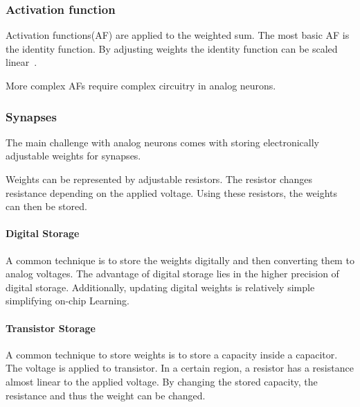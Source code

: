 \documentclass[conference]{IEEEtran}
\begin{document}
    \subsubsection{Activation function}

    Activation functions(AF) are applied to the weighted sum.
    The most basic AF is the identity function.
    By adjusting weights the identity function can be scaled linear~\cite{zurada1992analog}.

    More complex AFs require complex circuitry in analog neurons.

    \subsubsection{Synapses}
    The main challenge with analog neurons comes with storing electronically adjustable weights for synapses.

    Weights can be represented by adjustable resistors.
    The resistor changes resistance depending on the applied voltage.
    Using these resistors, the weights can then be stored.


    \paragraph{Digital Storage}
    A common technique is to store the weights digitally and then converting them to analog voltages.
    The advantage of digital storage lies in the higher precision of digital storage.
    Additionally, updating digital weights is relatively simple simplifying on-chip Learning.

    \paragraph{Transistor Storage}
    A common technique to store weights is to store a capacity inside a capacitor.
    The voltage is applied to transistor.
    In a certain region, a resistor has a resistance almost linear to the applied voltage.
    By changing the stored capacity, the resistance and thus the weight can be changed.
\end{document}

